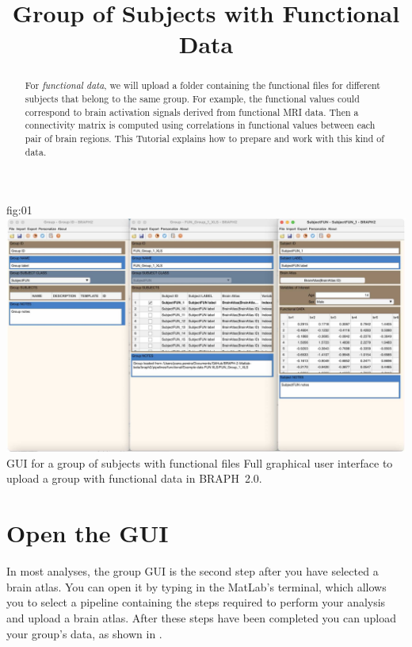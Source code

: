 \documentclass[justified]{tufte-handout}
\title{Group of Subjects with Functional Data}
\begin{document}
\maketitle

\begin{abstract}
\noindent
For \emph{functional data}, we will upload a folder containing the functional files for different subjects that belong to the same group. For example, the functional values could correspond to brain activation signals derived from functional MRI data. Then a connectivity matrix is computed using correlations in functional values between each pair of brain regions. This Tutorial explains how to prepare and work with this kind of data.
\end{abstract}

\tableofcontents

	{fig:01}
	{\includegraphics{fig01.jpg}}
	{GUI for a group of subjects with functional files}
	{
	Full graphical user interface to upload a group with functional data in BRAPH~2.0. 
	}

\clearpage
\section{Open the GUI}

In most analyses, the group GUI is the second step after you have selected a brain atlas. You can open it by typing  in the MatLab's terminal, which allows you to select a pipeline containing the steps required to perform your analysis and upload a brain atlas. After these steps have been completed you can upload your group's data, as shown in .
\end{document}
